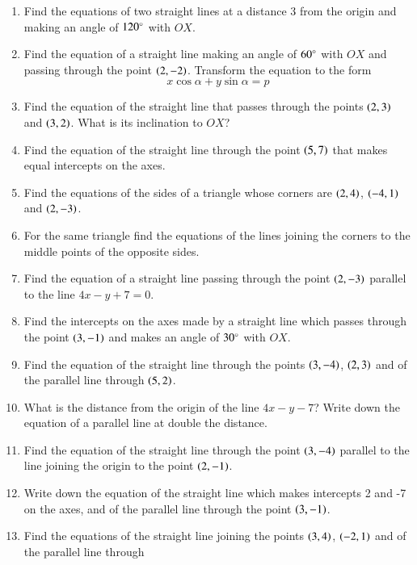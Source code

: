 \renewcommand{\theequation}{\theenumi}
\begin{enumerate}[label=\arabic*.,ref=\thesubsection.\theenumi]
\item Find the equations of two straight lines at a distance 3 from the origin and making an angle of $120 \degree$ with $OX$.
\item Find the equation of a straight line making an angle of $60\degree$ with $OX$ and passing through the point $\left(2,-2\right)$.
Transform the equation to the form
\begin{equation*}
x\cos\alpha + y\sin \alpha = p 
\end{equation*}
\item Find the equation of the straight line that passes through the points $\left(2,3\right)$ and $\left(3,2\right)$. What is its inclination
to $OX$?
\item Find the equation of the straight line through the point $\left(5,7\right)$ that makes equal intercepts on the axes.
\item Find the equations of the sides of a triangle whose corners are $\left(2,4\right)$, $\left(-4,1\right)$ and $\left(2,-3\right)$.
\item For the same triangle find the equations of the lines joining the corners to the middle points of the opposite sides.
\item Find the equation of a straight line passing through the point $\left(2,-3\right)$ parallel to the line $4x-y+7=0$.
\item Find the intercepts on the axes made by a straight line which passes through the point $\left(3,-1\right)$ and makes an angle
of $30\degree$ with $OX$.
\item Find the equation of the straight line through the points $\left(3,-4\right)$, $\left(2,3\right)$ and of the
parallel line through $\left(5,2\right)$.
\item What is the distance from the origin of the line $4x-y-7$? Write down the equation of a parallel line at double the distance.
\item Find the equation of the straight line through the point $\left(3,-4\right)$ parallel to the line joining the origin to the point
$\left(2,-1\right)$.
\item Write down the equation of the straight line which makes intercepts 2 and -7 on the axes, and of the parallel line through
the point $\left(3,-1\right)$.
\item Find the equations of the straight line joining the points $\left(3,4\right)$, $\left(-2,1\right)$ and of the parallel line through

\end{enumerate}

